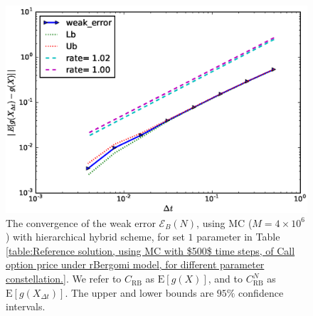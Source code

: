 \documentclass[11pt]{article}
\newcommand{\expt}[1]{\mathrm{E}\left[#1\right]}
\begin{document}
\FloatBarrier
\begin{figure}[h!]
	\centering
		\includegraphics[width=0.6\linewidth]{./figures/rBergomi_weak_error_rates/without_richardson/H_007/weak_convergence_order_Bergomi_H_007_K_1_M_4_10_6_CI_relative_hybrid_non_hierarchical_non_parallel_asymptotic}
		
	\caption{The  convergence of the weak error $\mathcal{E}_B(N)$, using MC ($M=4 \times 10^6$) with hierarchical hybrid scheme, for set $1$ parameter in Table \ref{table:Reference solution, using MC with $500$ time steps, of Call option price under rBergomi model, for different parameter constellation.}. We refer to $C_{\text{RB}}$ as $\expt{g(X)}$, and to $C_{\text{RB}}^{N}$ as  $\expt{g(X_{\Delta t})}$. The upper and lower bounds are $95\%$ confidence intervals.}
	\label{fig:Weak_rate_set1_without_rich_hybrid}
\end{figure}
\FloatBarrier
\end{document}
